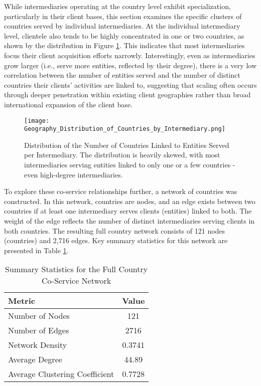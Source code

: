 While intermediaries operating at the country level exhibit specialization, particularly in their client bases, this section examines the specific clusters of countries served by individual intermediaries. At the individual intermediary level, clientele also tends to be highly concentrated in one or two countries, as shown by the distribution in Figure \ref{fig:geography_distribution_countries_by_intermediary}. This indicates that most intermediaries focus their client acquisition efforts narrowly. Interestingly, even as intermediaries grow larger (i.e., serve more entities, reflected by their degree), there is a very low correlation between the number of entities served and the number of distinct countries their clients' activities are linked to, suggesting that scaling often occurs through deeper penetration within existing client geographies rather than broad international expansion of the client base.

\begin{figure}[htbp]
    \centering
    \texttt{[image: Geography\_Distribution\_of\_Countries\_by\_Intermediary.png]}
    \caption{Distribution of the Number of Countries Linked to Entities Served per Intermediary. The distribution is heavily skewed, with most intermediaries serving entities linked to only one or a few countries - even high-degree intermediaries.}
    \label{fig:geography_distribution_countries_by_intermediary}
\end{figure}

To explore these co-service relationships further, a network of countries was constructed. In this network, countries are nodes, and an edge exists between two countries if at least one intermediary serves clients (entities) linked to both. The weight of the edge reflects the number of distinct intermediaries serving clients in both countries. The resulting full country network consists of 121 nodes (countries) and 2,716 edges. Key summary statistics for this network are presented in Table \ref{tab:country_network_summary}. 

\begin{table}[htbp]
\centering
\caption{Summary Statistics for the Full Country Co-Service Network}
\label{tab:country_network_summary}
\begin{tabular}{lc}
\toprule
\textbf{Metric}                        & \textbf{Value}    \\
\midrule
Number of Nodes               & 121      \\
Number of Edges               & 2716     \\
Network Density               & 0.3741   \\
Average Degree                & 44.89    \\
Average Clustering Coefficient & 0.7728   \\
\bottomrule
\end{tabular}
\end{table}


